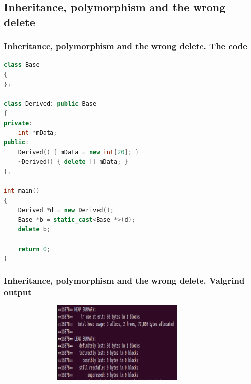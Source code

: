 \documentclass{bredelebeamer}
\begin{document}
\subsection{Inheritance, polymorphism and the wrong delete}


\begin{frame}[fragile]
\frametitle{Inheritance, polymorphism and the wrong delete. The code} 
	\begin{center}
		\begin{lstlisting}[language=C++]
class Base
{
};

class Derived: public Base
{
private:
	int *mData;
public:
	Derived() { mData = new int[20]; }
	~Derived() { delete [] mData; }
};

int main()
{
	Derived *d = new Derived();
	Base *b = static_cast<Base *>(d);
	delete b;

	return 0;
}
		\end{lstlisting}
	\end{center}
\end{frame}

\begin{frame}[fragile]
	\frametitle{Inheritance, polymorphism and the wrong delete. Valgrind output}
	\begin{center}
		\begin{figure}
			\includegraphics[height=4cm,width=10cm]{virtual_destructor.png}
		\end{figure}
	\end{center}
\end{frame}
\end{document}
